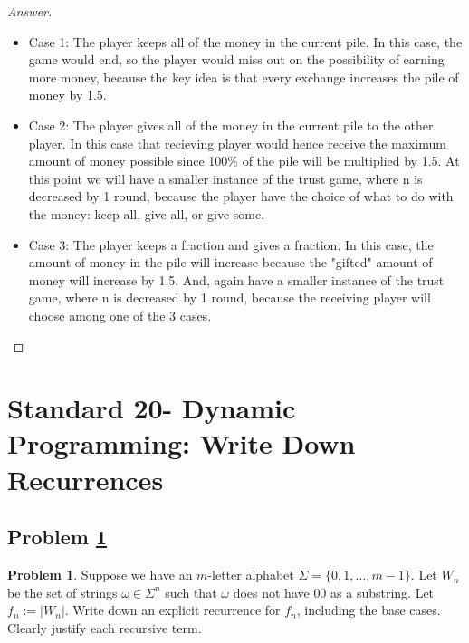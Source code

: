 \documentclass[11pt]{article}
\theoremstyle{definition}
\theoremstyle{definition}
\newtheorem{required}{Problem}
\theoremstyle{definition}
\begin{document}
\begin{proof}[Answer]
\begin{itemize}
\item Case 1: The player keeps all of the money in the current pile. In this case, the game would end, so the player would miss out on the possibility of earning more money, because the key idea is that every exchange increases the pile of money by 1.5. 
\item Case 2: The player gives all of the money in the current pile to the other player. In this case that recieving player would hence receive the maximum amount of money possible since 100\% of the pile will be multiplied by 1.5. At this point we will have a smaller instance of the trust game, where n is decreased by 1 round, because the player have the choice of what to do with the money: keep all, give all, or give some.
\item Case 3: The player keeps a fraction and gives a fraction. In this case, the amount of money in the pile will increase because the "gifted" amount of money will increase by 1.5. And, again have a smaller instance of the trust game, where n is decreased by 1 round, because the receiving player will choose among one of the 3 cases. 
\end{itemize}
\end{proof}




\newpage
\section{Standard 20- Dynamic Programming: Write Down Recurrences}

\subsection{Problem \ref{DP3}}

\begin{required} \label{DP3}
Suppose we have an $m$-letter alphabet $\Sigma = \{0, 1, \ldots, m-1\}$. Let $W_{n}$ be the set of strings $\omega \in \Sigma^{n}$ such that $\omega$ does not have $00$ as a substring. Let $f_{n} := |W_{n}|$. Write down an explicit recurrence for $f_{n}$, including the base cases. Clearly justify each recursive term.
\end{required}
\end{document}
